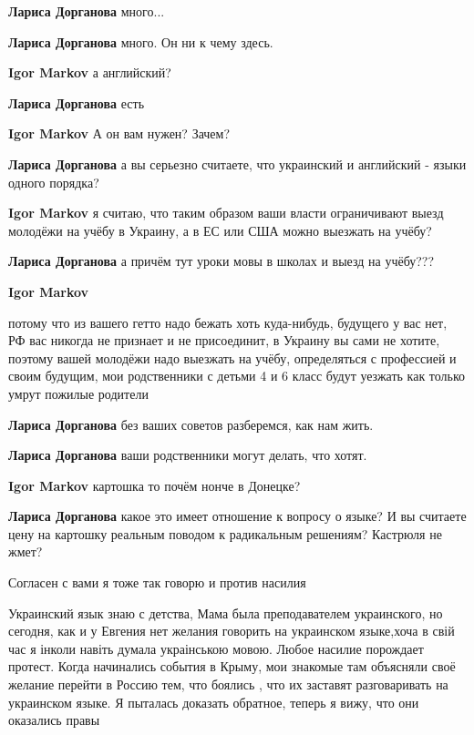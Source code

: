 \begin{itemize}
\begin{itemize}
\textbf{Лариса Дорганова} много...

\textbf{Лариса Дорганова} много. Он ни к чему здесь.

\textbf{Igor Markov} а английский?

\textbf{Лариса Дорганова} есть

\textbf{Igor Markov} А он вам нужен? Зачем?

\textbf{Лариса Дорганова} а вы серьезно считаете, что украинский и английский - языки одного порядка?

\textbf{Igor Markov} я считаю, что таким образом ваши власти ограничивают выезд молодёжи на учёбу в Украину, а в ЕС или США можно выезжать на учёбу?

\textbf{Лариса Дорганова} а причём тут уроки мовы в школах и выезд на учёбу???

\textbf{Igor Markov} 

потому что из вашего гетто надо бежать хоть куда-нибудь, будущего у вас нет, РФ
вас никогда не признает и не присоединит, в Украину вы сами не хотите, поэтому
вашей молодёжи надо выезжать на учёбу, определяться с профессией и своим
будущим, мои родственники с детьми 4 и 6 класс будут уезжать как только умрут
пожилые родители

\textbf{Лариса Дорганова} без ваших советов разберемся, как нам жить.

\textbf{Лариса Дорганова} ваши родственники могут делать, что хотят.

\textbf{Igor Markov} картошка то почём нонче в Донецке?

\textbf{Лариса Дорганова} какое это имеет отношение к вопросу о языке? И вы считаете цену на картошку реальным поводом к радикальным решениям? Кастрюля не жмет?

\end{itemize} %

Согласен с вами я тоже так говорю и против насилия


Украинский язык знаю с детства, Мама была преподавателем украинского, но
сегодня, как и у Евгения нет желания говорить на украинском языке,хоча в свій
час я інколи навіть думала украінською мовою. Любое насилие порождает протест.
Когда начинались события в Крыму, мои знакомые там объясняли своё желание
перейти в Россию тем, что боялись , что их заставят разговаривать на украинском
языке. Я пыталась доказать обратное, теперь я вижу, что они оказались правы


\end{itemize}
